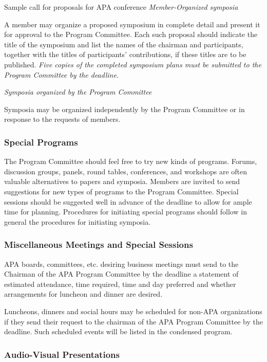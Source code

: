\begin{refsection}
\begin{apatextbox}{Sample call for proposals for APA conference}
\emph{Member-Organized symposia}

A member may organize a proposed symposium in complete detail and present it for approval to the Program Committee. Each such proposal should indicate the title of the symposium and list the names of the chairman and participants, together with the titles of participants' contributions, if these titles are to be published. \emph{Five copies of the completed symposium plans must be submitted to the Program Committee by the deadline.}

\emph{Symposia organized by the Program Committee}

Symposia may be organized independently by the Program Committee or in response to the requests of members.

\subsubsection{Special Programs}
\label{specialprograms}

The Program Committee should feel free to try new kinds of programs. Forums, discussion groups, panels, round tables, conferences, and workshops are often valuable alternatives to papers and symposia. Members are invited to send suggestions for new types of programs to the Program Committee. Special sessions should be suggested well in advance of the deadline to allow for ample time for planning. Procedures for initiating special programs should follow in general the procedures for initiating symposia.

\subsubsection{Miscellaneous Meetings and Special Sessions}
\label{miscellaneousmeetingsandspecialsessions}

APA boards, committees, etc. desiring business meetings must send to the Chairman of the APA Program Committee by the deadline a statement of estimated attendance, time required, time and day preferred and whether arrangements for luncheon and dinner are desired.

Luncheons, dinners and social hours may be scheduled for non-APA organizations if they send their request to the chairman of the APA Program Committee by the deadline. Such scheduled events will be listed in the condensed program.

\subsubsection{Audio-Visual Presentations}
\label{audio-visualpresentations}


\end{apatextbox}
\end{refsection}
